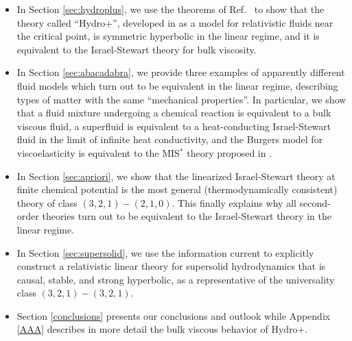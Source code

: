 \documentclass[a4paper, amsfonts, amssymb, amsmath, reprint, showkeys, nofootinbib, twoside, onecolumn,notitlepage]{revtex4-1}
\begin{document}
\begin{itemize}
\item In Section \ref{sec:hydroplus}, we use the theorems of Ref.\ \cite{paperI} to show that the theory called ``Hydro+'', developed in \cite{Hydro+2018} as a model for relativistic fluids near the critical point, is symmetric hyperbolic in the linear regime, and it is equivalent to the Israel-Stewart theory for bulk viscosity.
\item In Section \ref{sec:abacadabra}, we provide three examples of apparently different fluid models which turn out to be equivalent in the linear regime, describing types of matter with the same ``mechanical properties''. In particular, we show that a fluid mixture undergoing a chemical reaction is equivalent to a bulk viscous fluid, a superfluid is equivalent to a heat-conducting Israel-Stewart fluid in the limit of infinite heat conductivity, and the Burgers model for viscoelasticity is equivalent to the MIS$^*$ theory proposed in  \cite{KeYin2022}.
\item In Section \ref{sec:apriori}, we show that the linearized Israel-Stewart theory at finite chemical potential \cite{Israel_Stewart_1979} is the most general (thermodynamically consistent) theory of class $(3,2,1)-(2,1,0)$. This finally explains why all second-order theories \cite{Hishcock1983,OlsonLifsh1990,GerochLindblom1990,
carter1991,Baier2008,Denicol2012Boltzmann,
Stricker2019} turn out to be equivalent to the Israel-Stewart theory in the linear regime.
\item In Section \ref{sec:supersolid}, we use the information current to explicitly construct a relativistic linear theory for supersolid hydrodynamics that is causal, stable, and strong hyperbolic, as a representative of the universality class $(3,2,1)-(3,2,1)$.
\item Section \ref{conclusions} presents our conclusions and outlook while Appendix \ref{AAA} describes in more detail the bulk viscous behavior of Hydro+. 
\end{itemize}
\end{document}
